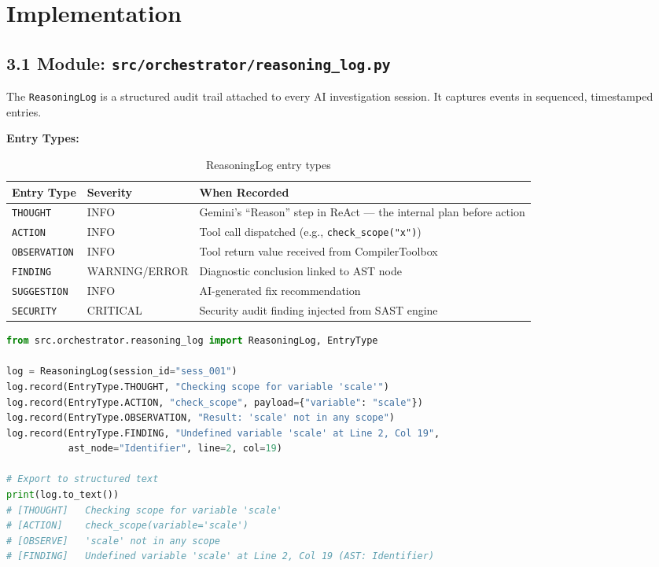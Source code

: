 \documentclass[a4paper,11pt]{article}
\begin{document}
\section{Implementation}

\subsection{3.1 Module: \texttt{src/orchestrator/reasoning\_log.py}}

The \texttt{ReasoningLog} is a structured audit trail attached to every AI investigation session. It captures events in sequenced, timestamped entries.

\textbf{Entry Types:}

\begin{table}[h]
\centering
\begin{tabularx}{\textwidth}{|l|l|X|}
\hline
\rowcolor{teal!10}
\textbf{Entry Type} & \textbf{Severity} & \textbf{When Recorded} \\
\hline
\texttt{THOUGHT} & INFO & Gemini's ``Reason'' step in ReAct — the internal plan before action \\
\hline
\texttt{ACTION} & INFO & Tool call dispatched (e.g., \texttt{check\_scope("x")}) \\
\hline
\texttt{OBSERVATION} & INFO & Tool return value received from CompilerToolbox \\
\hline
\texttt{FINDING} & WARNING/ERROR & Diagnostic conclusion linked to AST node \\
\hline
\texttt{SUGGESTION} & INFO & AI-generated fix recommendation \\
\hline
\texttt{SECURITY} & CRITICAL & Security audit finding injected from SAST engine \\
\hline
\end{tabularx}
\caption{ReasoningLog entry types}
\end{table}

\begin{lstlisting}[language=Python, caption=ReasoningLog usage example]
from src.orchestrator.reasoning_log import ReasoningLog, EntryType

log = ReasoningLog(session_id="sess_001")
log.record(EntryType.THOUGHT, "Checking scope for variable 'scale'")
log.record(EntryType.ACTION, "check_scope", payload={"variable": "scale"})
log.record(EntryType.OBSERVATION, "Result: 'scale' not in any scope")
log.record(EntryType.FINDING, "Undefined variable 'scale' at Line 2, Col 19",
           ast_node="Identifier", line=2, col=19)

# Export to structured text
print(log.to_text())
# [THOUGHT]   Checking scope for variable 'scale'
# [ACTION]    check_scope(variable='scale')
# [OBSERVE]   'scale' not in any scope
# [FINDING]   Undefined variable 'scale' at Line 2, Col 19 (AST: Identifier)
\end{lstlisting}
\end{document}
